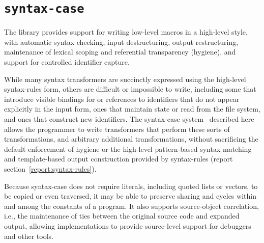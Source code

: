 \chapter{{\tt syntax-case}}
\label{syntaxcasechapter}



The  library
provides
support for writing low-level macros
in a high-level style, with automatic syntax checking, input
destructuring, output restructuring, maintenance of lexical scoping
and referential transparency (hygiene), and support for controlled
identifier capture.

\begin{rationale}
While many syntax transformers are succinctly expressed using the
high-level {\cf syntax-rules} form, others are difficult or impossible
to write, including some that introduce visible bindings for or references
to identifiers that do not appear explicitly in the input form, ones that
maintain state or read from the file system, and ones that construct new
identifiers.
The {\cf syntax-case} system~\cite{syntacticabstraction} described here
allows the programmer to write transformers that perform these sorts of
transformations, and arbitrary additional transformations, without
sacrificing the default enforcement of hygiene or the high-level
pattern-based syntax matching and template-based output construction
provided by {\cf syntax-rules} (report section~\ref{report:syntax-rules}).

Because {\cf syntax-case} does not require literals, including quoted
lists or vectors, to be copied or even traversed, it may be able to preserve sharing
and cycles within and among the constants of a program.  It also
supports source-object correlation, i.e., the maintenance of ties
between the original source code and expanded output, allowing
implementations to provide source-level support for debuggers and
other tools.
\end{rationale}

